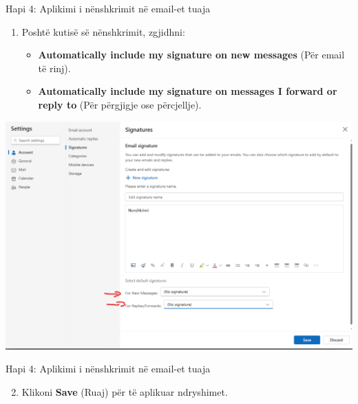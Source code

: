 \documentclass[
  ignorenonframetext,
]{beamer}
\providecommand{\tightlist}{%
  \setlength{\itemsep}{0pt}\setlength{\parskip}{0pt}}
\begin{document}
\begin{frame}{Hapi 4: Aplikimi i nënshkrimit në email-et tuaja}
\label{hapi-4-aplikimi-i-nuxebnshkrimit-nuxeb-email-et-tuaja}
\begin{enumerate}
\item
  Poshtë kutisë së nënshkrimit, zgjidhni:

  \begin{itemize}
  \item
    \textbf{Automatically include my signature on new messages} (Për
    email të rinj).
  \item
    \textbf{Automatically include my signature on messages I forward or
    reply to} (Për përgjigje ose përcjellje).
  \end{itemize}
\end{enumerate}

\includegraphics{./images/outlook9.png}
\end{frame}

\begin{frame}{Hapi 4: Aplikimi i nënshkrimit në email-et tuaja}
\label{hapi-4-aplikimi-i-nuxebnshkrimit-nuxeb-email-et-tuaja-1}
\begin{enumerate}
\setcounter{enumi}{1}
\tightlist
\item
  Klikoni \textbf{Save} (Ruaj) për të aplikuar ndryshimet.
\end{enumerate}
\end{frame}
\end{document}
